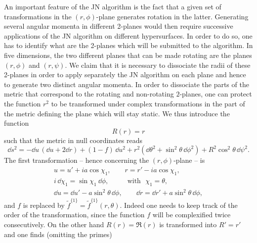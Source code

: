 An important feature of the JN algorithm is the fact that a given set of transformations in the $(r,\phi)$-plane generates rotation in the latter.
Generating several angular momenta in different 2-planes would then require successive applications of the JN algorithm on different hypersurfaces.
In order to do so, one has to identify what are the 2-planes which will be submitted to the algorithm.
In five dimensions, the two different planes that can be made rotating are the planes $(r,\phi)$ and $(r,\psi)$.
We claim that it is necessary to dissociate the radii of these 2-planes in order to apply separately the JN algorithm on each plane and hence to generate two distinct angular momenta.
In order to dissociate the parts of the metric that correspond to the rotating and non-rotating $2$-planes, one can protect the function $r^2$ to be transformed under complex transformations in the part of the metric defining the plane which will stay static.
We thus introduce the function
\begin{equation}
	R(r) = r
\end{equation} 
such that the metric in null coordinates reads
\begin{equation}
	\label{higher-jna:5d-jna:metric:static:general-ur}
	\dd s^2 = - \dd u\, (\dd u + 2 \dd r)
		+ (1 - f)\, \dd u^2
		+ r^2 (\dd\theta^2 + \sin^2 \theta\, \dd\phi^2) + R^2 \cos^2 \theta\, \dd\psi^2.
\end{equation} 
The first transformation -- hence concerning the $(r,\phi)$-plane -- is
\begin{equation}
	\label{higher-jna:eq:5d-ansatz-hopf-1}
	\begin{gathered}
		u = u' + i a \cos \chi_1, \qquad
		r = r' - i a \cos \chi_1, \\
		i\, \dd \chi_1 = \sin \chi_1\ \dd\phi, \qquad\text{~~with~~}\chi_1 = \theta, \\
		\dd u = \dd u' - a \sin^2 \theta\, \dd\phi, \qquad
		\dd r = \dd r' + a \sin^2 \theta\, \dd\phi,
	\end{gathered}
\end{equation}
and $f$ is replaced by $\tilde f^{\{1\}} = \tilde f^{\{1\}}(r, \theta)$.
Indeed one needs to keep track of the order of the transformation, since the function $f$ will be complexified twice consecutively.
On the other hand $R(r) = \Re(r)$ is transformed\footnotemark{} into $R' = r'$ and one finds (omitting the primes)%
